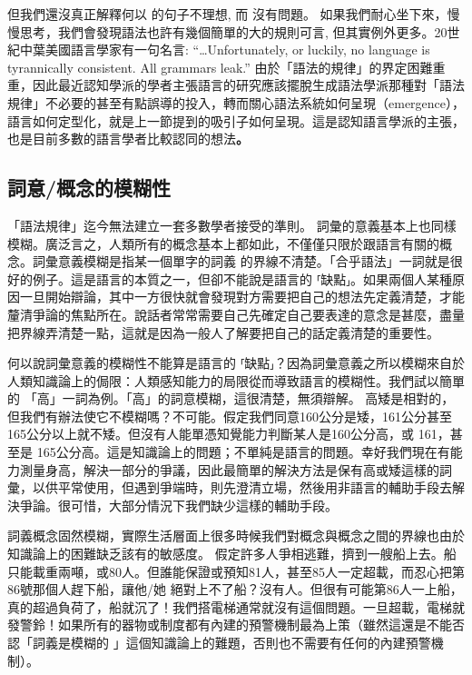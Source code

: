 但我們還沒真正解釋何以 的句子不理想, 而 沒有問題。 如果我們耐心坐下來，慢慢思考，我們會發現語法也許有幾個簡單的大的規則可言, 但其實例外更多。20世紀中葉美國語言學家\citet[39]{Sapir1921}有一句名言: ``…Unfortunately, or luckily, no language is tyrannically consistent. All grammars leak.'' 由於「語法的規律」的界定困難重重，因此最近認知學派的學者主張語言的研究應該擺脫生成語法學派那種對「語法規律」不必要的甚至有點誤導的投入，轉而關心語法系統如何呈現（emergence），語言如何定型化，就是上一節提到的吸引子如何呈現。這是認知語言學派的主張，也是目前多數的語言學者比較認同的想法\textbf{。} 

\subsection{詞意/概念的模糊性}

「語法規律」迄今無法建立一套多數學者接受的準則。 詞彙的意義基本上也同樣模糊。廣泛言之，人類所有的概念基本上都如此，不僅僅只限於跟語言有關的概念。詞彙意義模糊是指某一個單字的詞義 的界線不清楚。「合乎語法」一詞就是很好的例子。這是語言的本質之一，但卻不能說是語言的 ⸢缺點⸥。如果兩個人某種原因一旦開始辯論，其中一方很快就會發現對方需要把自己的想法先定義清楚，才能釐清爭論的焦點所在。說話者常常需要自己先確定自己要表達的意念是甚麼，盡量把界線弄清楚一點，這就是因為一般人了解要把自己的話定義清楚的重要性。   

何以說詞彙意義的模糊性不能算是語言的 ⸢缺點⸥？因為詞彙意義之所以模糊來自於人類知識論上的侷限：人類感知能力的局限從而導致語言的模糊性。我們試以簡單的 「高」一詞為例。「高」的詞意模糊，這很清楚，無須辯解。 高矮是相對的，但我們有辦法使它不模糊嗎？不可能。假定我們同意160公分是矮，161公分甚至 165公分以上就不矮。但沒有人能單憑知覺能力判斷某人是160公分高，或 161，甚至是 165公分高。這是知識論上的問題；不單純是語言的問題。幸好我們現在有能力測量身高，解決一部分的爭議，因此最簡單的解決方法是保有高或矮這樣的詞彙，以供平常使用，但遇到爭端時，則先澄清立場，然後用非語言的輔助手段去解決爭論。很可惜，大部分情況下我們缺少這樣的輔助手段。

詞義概念固然模糊，實際生活層面上很多時候我們對概念與概念之間的界線也由於知識論上的困難缺乏該有的敏感度。 假定許多人爭相逃難，擠到一艘船上去。船只能載重兩噸，或80人。但誰能保證或預知81人，甚至85人一定超載，而忍心把第86號那個人趕下船，讓他/她 絕對上不了船？沒有人。但很有可能第86人一上船，真的超過負荷了，船就沉了！我們搭電梯通常就沒有這個問題。一旦超載，電梯就發警鈴！如果所有的器物或制度都有內建的預警機制最為上策（雖然這還是不能否認「詞義是模糊的 」這個知識論上的難題，否則也不需要有任何的內建預警機制）。

